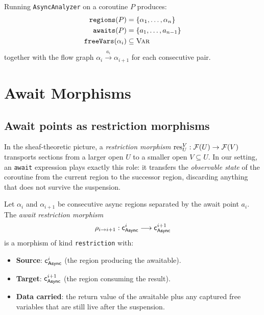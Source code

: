 \documentclass[11pt]{article}
\newcommand{\Async}{\mathsf{Async}}          %
\newcommand{\AwaitMor}[2]{\rho_{#1 \to #2}} %
\newcommand{\asyncCoord}[1]{\coord_{\Async}^{#1}} %
\newcommand{\asyncRegion}[1]{\alpha_{#1}}    %
\begin{document}
\begin{construction}\label{con:async-analyzer}
Running \texttt{AsyncAnalyzer} on a coroutine $P$ produces:
\begin{align*}
  \texttt{regions}(P) &= \{\asyncRegion{1}, \dots, \asyncRegion{n}\}\\
  \texttt{awaits}(P)  &= \{a_1, \dots, a_{n-1}\}\\
  \texttt{freeVars}(\asyncRegion{i}) &\subseteq \textsc{Var}
\end{align*}
together with the flow graph $\asyncRegion{i} \xrightarrow{a_i} \asyncRegion{i+1}$
for each consecutive pair.
\end{construction}

\section{Await Morphisms}\label{sec:await-morphisms}

\subsection{Await points as restriction morphisms}

In the sheaf-theoretic picture, a \emph{restriction morphism}
$\mathrm{res}_U^V : \mathcal{F}(U) \to \mathcal{F}(V)$ transports sections from a
larger open $U$ to a smaller open $V \subseteq U$.  In our setting, an
\texttt{await} expression plays exactly this role: it transfers the
\emph{observable state} of the coroutine from the current region to the
successor region, discarding anything that does not survive the suspension.

\begin{definition}\label{def:await-mor}
Let $\asyncRegion{i}$ and $\asyncRegion{i+1}$ be consecutive async regions
separated by the await point $a_i$.  The \emph{await restriction morphism}
\[
  \AwaitMor{i}{i+1} : \asyncCoord{i} \longrightarrow \asyncCoord{i+1}
\]
is a morphism of kind \texttt{restriction} with:
\begin{itemize}
  \item \textbf{Source}: $\asyncCoord{i}$ (the region producing the awaitable).
  \item \textbf{Target}: $\asyncCoord{i+1}$ (the region consuming the result).
  \item \textbf{Data carried}: the return value of the awaitable plus any
        captured free variables that are still live after the suspension.
\end{itemize}
\end{definition}
\end{document}
